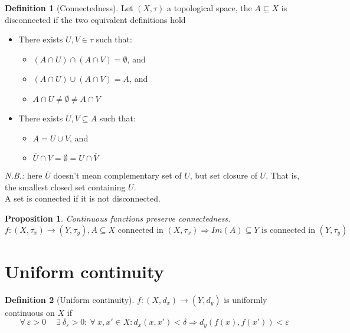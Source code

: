 \documentclass{article}
\newcommand{\Ar}{\Rightarrow}
\newcommand{\f}[3]{#1 : #2 \rightarrow #3}
\theoremstyle{definition}
\newtheorem{definition}{Definition}[section]
\theoremstyle{definition}
\theoremstyle{plain}
\theoremstyle{plain}
\theoremstyle{plain}
\theoremstyle{plain}
\newtheorem{proposition}[theorem]{Proposition}
\theoremstyle{definition}
\theoremstyle{remark}
\theoremstyle{remark}
\theoremstyle{remark}
\theoremstyle{remark}
\newcommand{\ForAll}{\ \forall \ }
\newcommand{\Exists}{\ \exists \ }
\newcommand{\E}{\varepsilon}
\begin{document}
\begin{definition}[Connectedness]
  Let $(X, \tau)$ a topological space, the $A \subseteq X$ is disconnected if the two equivalent definitions hold
  \begin{itemize}
    \item There exists $U, V \in \tau$ such that:
    \begin{itemize}
      \item $(A \cap U) \cap (A \cap V) = \emptyset$, and
      \item $(A \cap U) \cup (A \cap V) = A$, and
      \item $A \cap U \neq \emptyset \neq A \cap V$
    \end{itemize}
    \item There exists $U, V \subseteq A$ such that:
    \begin{itemize}
      \item $A = U \cup V$, and
      \item $\overline{U} \cap V = \emptyset = U \cap \overline{V}$
    \end{itemize}
  \end{itemize}
  \textit{N.B.:} here $\overline{U}$ doesn't mean complementary set of $U$, but set closure of $U$. That is, the smallest closed set containing $U$.\\
  A set is connected if it is not disconnected.
\end{definition}


\begin{proposition}
  Continuous functions preserve connectedness.\\
  \[
  \f{f}{(X,\tau_x)}{(Y,\tau_y)}, A \subseteq X \text{ connected in } (X,\tau_x) \Ar Im(A) \subseteq Y \text{ is connected in } (Y,\tau_y)
  \]
\end{proposition}



\section{Uniform continuity}


\begin{definition}[Uniform continuity]
  $\f{f}{(X,d_x)}{(Y,d_y)}$ is uniformly continuous on $X$ if
  \[
  \ForAll \E > 0 \quad \Exists \delta_\E > 0 : \ForAll x,x' \in X : d_x(x,x')
  < \delta \Ar d_y(f(x),f(x')) < \E
  \]
\end{definition}
\end{document}
